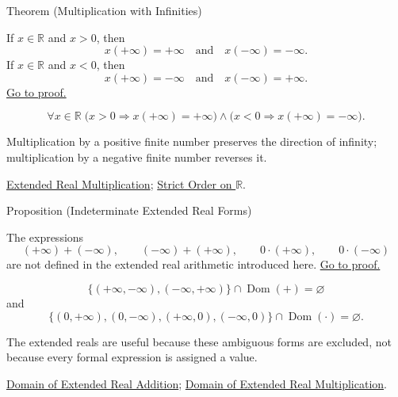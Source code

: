 \begin{theorembox}{Theorem (Multiplication with Infinities)}
\begin{theorem}
\label{thm:extended-real-multiplication-with-infinities}
If $x\in\mathbb{R}$ and $x>0$, then
\[
x(+\infty)=+\infty
\quad\text{and}\quad
x(-\infty)=-\infty.
\]
If $x\in\mathbb{R}$ and $x<0$, then
\[
x(+\infty)=-\infty
\quad\text{and}\quad
x(-\infty)=+\infty.
\]
\hyperref[prf:extended-real-multiplication-with-infinities]{Go to proof.}
\end{theorem}
\end{theorembox}
\begin{remark*}
\[
\forall x\in\mathbb{R}\;
\bigl(x>0\Rightarrow x(+\infty)=+\infty\bigr)
\land
\bigl(x<0\Rightarrow x(+\infty)=-\infty\bigr).
\]
\end{remark*}
\begin{remark*}[Interpretation]
Multiplication by a positive finite number preserves the direction of
infinity; multiplication by a negative finite number reverses it.
\end{remark*}
\begin{dependencies}
\hyperref[def:extended-real-multiplication]{Extended Real Multiplication};
\hyperref[def:strict-order-on-r]{Strict Order on $\mathbb{R}$}.
\end{dependencies}

\begin{propositionbox}{Proposition (Indeterminate Extended Real Forms)}
\begin{proposition}
\label{prop:indeterminate-extended-real-forms}
The expressions
\[
(+\infty)+(-\infty),\qquad
(-\infty)+(+\infty),\qquad
0\cdot(+\infty),\qquad
0\cdot(-\infty)
\]
are not defined in the extended real arithmetic introduced here.
\hyperref[prf:indeterminate-extended-real-forms]{Go to proof.}
\end{proposition}
\end{propositionbox}
\begin{remark*}
\[
\{(+\infty,-\infty),(-\infty,+\infty)\}\cap\operatorname{Dom}(+)=\varnothing
\]
and
\[
\{(0,+\infty),(0,-\infty),(+\infty,0),(-\infty,0)\}
\cap\operatorname{Dom}(\cdot)=\varnothing.
\]
\end{remark*}
\begin{remark*}[Interpretation]
The extended reals are useful because these ambiguous forms are excluded, not
because every formal expression is assigned a value.
\end{remark*}
\begin{dependencies}
\hyperref[def:extended-real-addition-domain]{Domain of Extended Real Addition};
\hyperref[def:extended-real-multiplication-domain]{Domain of Extended Real Multiplication}.
\end{dependencies}
